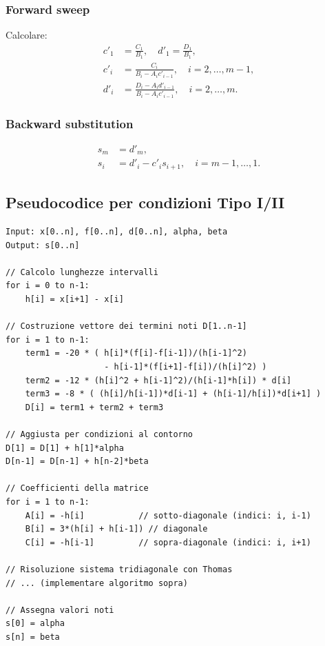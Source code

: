 \documentclass[12pt]{article}
\begin{document}
\subsubsection{Forward sweep}
Calcolare:
\[
\begin{aligned}
c'_1 &= \frac{C_1}{B_1}, \quad d'_1 = \frac{D_1}{B_1}, \\
c'_i &= \frac{C_i}{B_i - A_i c'_{i-1}}, \quad i = 2,\dots,m-1, \\
d'_i &= \frac{D_i - A_i d'_{i-1}}{B_i - A_i c'_{i-1}}, \quad i = 2,\dots,m.
\end{aligned}
\]

\subsubsection{Backward substitution}
\[
\begin{aligned}
s_m &= d'_m, \\
s_i &= d'_i - c'_i s_{i+1}, \quad i = m-1,\dots,1.
\end{aligned}
\]

\subsection{Pseudocodice per condizioni Tipo I/II}
\begin{verbatim}
Input: x[0..n], f[0..n], d[0..n], alpha, beta
Output: s[0..n]

// Calcolo lunghezze intervalli
for i = 0 to n-1:
    h[i] = x[i+1] - x[i]

// Costruzione vettore dei termini noti D[1..n-1]
for i = 1 to n-1:
    term1 = -20 * ( h[i]*(f[i]-f[i-1])/(h[i-1]^2) 
                    - h[i-1]*(f[i+1]-f[i])/(h[i]^2) )
    term2 = -12 * (h[i]^2 + h[i-1]^2)/(h[i-1]*h[i]) * d[i]
    term3 = -8 * ( (h[i]/h[i-1])*d[i-1] + (h[i-1]/h[i])*d[i+1] )
    D[i] = term1 + term2 + term3

// Aggiusta per condizioni al contorno
D[1] = D[1] + h[1]*alpha
D[n-1] = D[n-1] + h[n-2]*beta

// Coefficienti della matrice
for i = 1 to n-1:
    A[i] = -h[i]           // sotto-diagonale (indici: i, i-1)
    B[i] = 3*(h[i] + h[i-1]) // diagonale
    C[i] = -h[i-1]         // sopra-diagonale (indici: i, i+1)

// Risoluzione sistema tridiagonale con Thomas
// ... (implementare algoritmo sopra)

// Assegna valori noti
s[0] = alpha
s[n] = beta
\end{verbatim}
\end{document}
